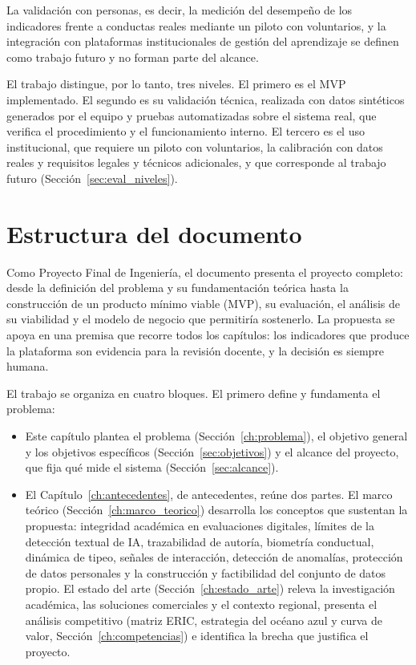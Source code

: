 La validación con personas, es decir, la medición del desempeño de los indicadores frente a conductas reales mediante un piloto con voluntarios, y la integración con plataformas institucionales de gestión del aprendizaje se definen como trabajo futuro y no forman parte del alcance.

El trabajo distingue, por lo tanto, tres niveles. El primero es el MVP implementado. El segundo es su validación técnica, realizada con datos sintéticos generados por el equipo y pruebas automatizadas sobre el sistema real, que verifica el procedimiento y el funcionamiento interno. El tercero es el uso institucional, que requiere un piloto con voluntarios, la calibración con datos reales y requisitos legales y técnicos adicionales, y que corresponde al trabajo futuro (Sección~\ref{sec:eval_niveles}).

\section{Estructura del documento}
\label{sec:intro_estructura}

Como Proyecto Final de Ingeniería, el documento presenta el proyecto completo: desde la definición del problema y su fundamentación teórica hasta la construcción de un producto mínimo viable (MVP), su evaluación, el análisis de su viabilidad y el modelo de negocio que permitiría sostenerlo. La propuesta se apoya en una premisa que recorre todos los capítulos: los indicadores que produce la plataforma son evidencia para la revisión docente, y la decisión es siempre humana.

El trabajo se organiza en cuatro bloques. El primero define y fundamenta el problema:

\begin{itemize}
    \item Este capítulo plantea el problema (Sección~\ref{ch:problema}), el objetivo general y los objetivos específicos (Sección~\ref{sec:objetivos}) y el alcance del proyecto, que fija qué mide el sistema (Sección~\ref{sec:alcance}).
    \item El Capítulo~\ref{ch:antecedentes}, de antecedentes, reúne dos partes. El marco teórico (Sección~\ref{ch:marco_teorico}) desarrolla los conceptos que sustentan la propuesta: integridad académica en evaluaciones digitales, límites de la detección textual de IA, trazabilidad de autoría, biometría conductual, dinámica de tipeo, señales de interacción, detección de anomalías, protección de datos personales y la construcción y factibilidad del conjunto de datos propio. El estado del arte (Sección~\ref{ch:estado_arte}) releva la investigación académica, las soluciones comerciales y el contexto regional, presenta el análisis competitivo (matriz ERIC, estrategia del océano azul y curva de valor, Sección~\ref{ch:competencias}) e identifica la brecha que justifica el proyecto.
\end{itemize}

